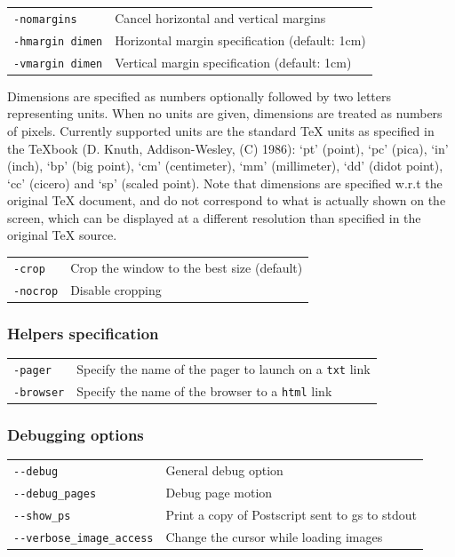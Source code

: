 \documentclass[12pt]{article}
\begin{document}
\medskip\noindent\begin{tabular}{ll}
\verb"-nomargins"          & Cancel horizontal and vertical margins \\
\verb"-hmargin dimen"      & Horizontal margin specification (default: 1cm) \\
\verb"-vmargin dimen"      & Vertical margin specification   (default: 1cm) \\
\end{tabular}

Dimensions are specified as numbers optionally followed by two letters
representing units. When no units are given, dimensions are treated
as numbers of pixels. Currently supported units are the standard TeX
units as specified in the TeXbook (D. Knuth, Addison-Wesley, (C)
1986):
 `pt' (point), `pc' (pica), `in' (inch), `bp' (big point),
 `cm' (centimeter), `mm' (millimeter), `dd' (didot point),
 `cc' (cicero) and `sp' (scaled point).
Note that dimensions are specified w.r.t the original TeX document,
and do not correspond to what is actually shown on the screen, which
can be displayed at a different resolution than specified in the
original TeX source.

\medskip\noindent\begin{tabular}{ll}
\verb"-crop"               & Crop the window to the best size (default) \\
\verb"-nocrop"             & Disable cropping
\end{tabular}

\subsubsection*{Helpers specification}

\medskip\noindent\begin{tabular}{ll}
\verb"-pager" & Specify the name of the pager to launch on a \verb"txt" link\\
\verb"-browser" & Specify the name of the browser to a \verb"html" link\\
\end{tabular}

\subsubsection*{Debugging options}

\medskip\noindent\begin{tabular}{ll}
\verb"--debug" & General debug option \\
\verb"--debug_pages" & Debug page motion \\
\verb"--show_ps" & Print a copy of Postscript sent to gs to stdout \\
\verb"--verbose_image_access" & Change the cursor while loading images\\
\end{tabular}
\end{document}

